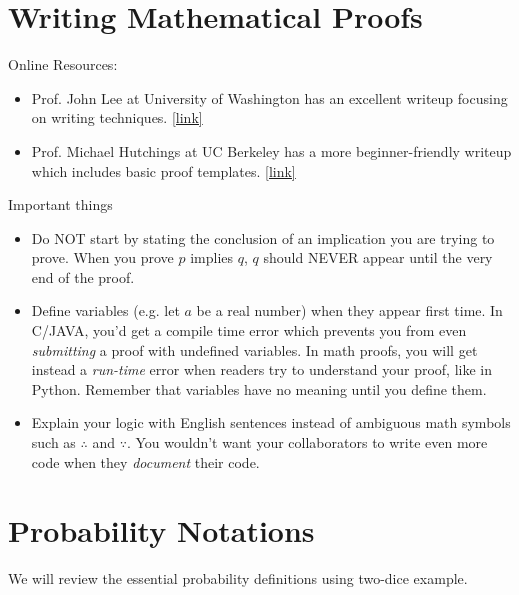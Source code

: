 \documentclass{discussion}
\begin{document}

\section{Writing Mathematical Proofs}

Online Resources:
\begin{itemize}
\item Prof. John Lee at University of Washington has an excellent writeup focusing on writing techniques. \href{https://www.math.washington.edu/~lee/Writing/writing-proofs.pdf}{[link]}
\item Prof. Michael Hutchings at UC Berkeley has a more beginner-friendly writeup which includes basic proof templates. \href{https://math.berkeley.edu/~hutching/teach/proofs.pdf}{[link]}
\end{itemize}

Important things
\begin{itemize}
\item Do NOT start by stating the conclusion of an implication you are trying to prove. When you  prove $p$ implies $q$, $q$ should NEVER appear until the very end of the proof.
\item Define variables (e.g. let $a$ be a real number) when they appear first time. In C/JAVA, you'd get a compile time error which prevents you from even \emph{submitting} a proof with undefined variables. In math proofs, you will get instead a \emph{run-time} error when readers try to understand your proof, like in Python. Remember that variables have no meaning until you define them.
\item Explain your logic with English sentences instead of ambiguous math symbols such as $\therefore$ and $\because$.  You wouldn't want your collaborators to write even more code when they \emph{document} their code.
\end{itemize}

\section{Probability Notations}
We will review the essential probability definitions using two-dice example.

\newcommand{\var}{\mathrm{Var}}
\renewcommand{\E}{\mathbb{E}}
\end{document}
